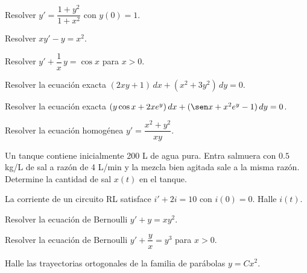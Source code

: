 \begin{prob}
Resolver \(y' = \dfrac{1+y^2}{1+x^2}\) con \(y(0)=1\).
\end{prob}

\begin{prob}
Resolver \(xy' - y = x^2\).
\end{prob}

\begin{prob}
Resolver \(y' + \dfrac{1}{x}\,y = \cos x\) para \(x>0\).
\end{prob}

\begin{prob}
Resolver la ecuación exacta \((2xy+1)\,dx + (x^2+3y^2)\,dy = 0\).
\end{prob}

\begin{prob}
Resolver la ecuación exacta \((y\cos x + 2xe^y)\,dx + (\sen x + x^2 e^y - 1)\,dy = 0\).
\end{prob}

\begin{prob}
Resolver la ecuación homogénea \(y' = \dfrac{x^2+y^2}{xy}\).
\end{prob}

\begin{prob}
Un tanque contiene inicialmente 200 L de agua pura. Entra salmuera con \(0.5\) kg/L de sal a razón de 4 L/min y la mezcla bien agitada sale a la misma razón. Determine la cantidad de sal \(x(t)\) en el tanque.
\end{prob}

\begin{prob}
La corriente de un circuito RL satisface \(i' + 2i = 10\) con \(i(0)=0\). Halle \(i(t)\).
\end{prob}

\begin{prob}
Resolver la ecuación de Bernoulli \(y' + y = x y^2\).
\end{prob}

\begin{prob}
Resolver la ecuación de Bernoulli \(y' + \dfrac{y}{x} = y^3\) para \(x>0\).
\end{prob}

\begin{prob}
Halle las trayectorias ortogonales de la familia de parábolas \(y = Cx^2\).
\end{prob}
